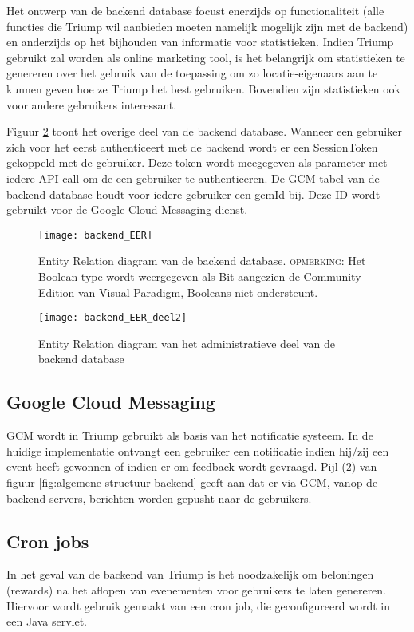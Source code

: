 Het ontwerp van de backend database focust enerzijds op functionaliteit (alle functies die Triump wil aanbieden moeten namelijk mogelijk zijn met de backend) en anderzijds op het bijhouden van informatie voor statistieken. Indien Triump gebruikt zal worden als online marketing tool, is het belangrijk om statistieken te genereren over het gebruik van de toepassing om zo locatie-eigenaars aan te kunnen geven hoe ze Triump het best gebruiken. Bovendien zijn statistieken ook voor andere gebruikers interessant.

Figuur \ref{fig:Backend ER 2} toont het overige deel van de backend database. Wanneer een gebruiker zich voor het eerst authenticeert met de backend wordt er een SessionToken gekoppeld met de gebruiker. Deze token wordt meegegeven als parameter met iedere API call om de een gebruiker te authenticeren. De GCM tabel van de backend database houdt voor iedere gebruiker een gcmId bij. Deze ID wordt gebruikt voor de Google Cloud Messaging dienst.

\begin{figure}[H]
	\texttt{[image: backend\_EER]}
	\caption{Entity Relation diagram van de backend database. \textsc{opmerking}: Het Boolean type wordt weergegeven als Bit aangezien de Community Edition van Visual Paradigm, Booleans niet ondersteunt. }
	\label{fig:Backend ER}
\end{figure}


\begin{figure}[H]
	\centering
	\texttt{[image: backend\_EER\_deel2]}
	\caption{Entity Relation diagram van het administratieve deel van de backend database}
	\label{fig:Backend ER 2}
\end{figure}
\subsection{Google Cloud Messaging}
GCM wordt in Triump gebruikt als basis van het notificatie systeem. In de huidige implementatie ontvangt een gebruiker een notificatie indien hij/zij een event heeft gewonnen of indien er om feedback wordt gevraagd. 
Pijl (2) van figuur \ref{fig:algemene structuur backend} geeft aan dat er via GCM, vanop de backend servers, berichten worden gepusht naar de gebruikers.

\subsection{Cron jobs}
In het geval van de backend van Triump is het noodzakelijk om beloningen (rewards) na het aflopen van evenementen voor gebruikers te laten genereren. Hiervoor wordt gebruik gemaakt van een cron job, die geconfigureerd wordt in een Java servlet. 

